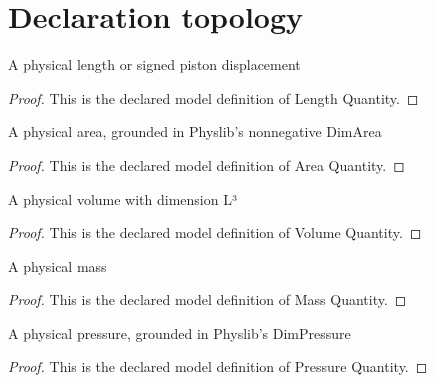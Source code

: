 \section{Declaration topology}
\begin{definition}
  \label{def:physics:phyx-mini-0446:phyxminiproblems-problemphyxmini0446-lengthquantity}
  A physical length or signed piston displacement
\end{definition}
\begin{proof}
  This is the declared model definition of Length Quantity.
\end{proof}
\begin{definition}
  \label{def:physics:phyx-mini-0446:phyxminiproblems-problemphyxmini0446-areaquantity}
  A physical area, grounded in Physlib's nonnegative DimArea
\end{definition}
\begin{proof}
  This is the declared model definition of Area Quantity.
\end{proof}
\begin{definition}
  \label{def:physics:phyx-mini-0446:phyxminiproblems-problemphyxmini0446-volumequantity}
  A physical volume with dimension L³
\end{definition}
\begin{proof}
  This is the declared model definition of Volume Quantity.
\end{proof}
\begin{definition}
  \label{def:physics:phyx-mini-0446:phyxminiproblems-problemphyxmini0446-massquantity}
  A physical mass
\end{definition}
\begin{proof}
  This is the declared model definition of Mass Quantity.
\end{proof}
\begin{definition}
  \label{def:physics:phyx-mini-0446:phyxminiproblems-problemphyxmini0446-pressurequantity}
  A physical pressure, grounded in Physlib's DimPressure
\end{definition}
\begin{proof}
  This is the declared model definition of Pressure Quantity.
\end{proof}
